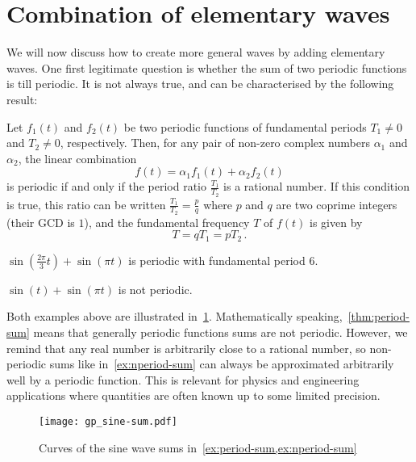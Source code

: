 \section{Combination of elementary waves}
We will now discuss how to create more general waves by adding elementary waves. One first
legitimate question is whether the sum of two periodic functions is till periodic. It is
not always true, and can be characterised by the following result:
\begin{theorem}
  \label{thm:period-sum}
  Let $f_1(t)$ and $f_2(t)$ be two periodic functions of fundamental periods $T_1\neq 0$
  and $T_2\neq 0$, respectively. Then, for any pair of non-zero complex numbers $\alpha_1$
  and $\alpha_2$, the linear combination
  \begin{equation}
    f(t)=\alpha_1 f_1(t)+\alpha_2 f_2(t)
  \end{equation}
  is periodic if and only if the period ratio  $\frac{T_1}{T_2}$ is a rational number. If
  this condition is true, this ratio can be written $\frac{T_1}{T_2}=\frac{p}{q}$ where
  $p$ and $q$ are two coprime integers (\ie their GCD is $1$), and the fundamental
  frequency $T$ of $f(t)$ is given by
  \begin{equation}
    T=qT_1=pT_2\,.
  \end{equation}
\end{theorem}
\begin{example}
  \label{ex:period-sum}
  $\sin\left(\frac{2\pi}{3}t\right)+\sin(\pi t)$ is periodic with fundamental period $6$.
\end{example}
\begin{example}
  \label{ex:nperiod-sum}
  $\sin(t)+\sin(\pi t)$ is not periodic.
\end{example}
\noindent Both examples above are illustrated in~\cref{fig:sine-sum}. Mathematically
speaking,~\cref{thm:period-sum} means that generally periodic functions sums are not
periodic. However, we remind that any real number is arbitrarily close to a rational
number, so non-periodic sums like in~\cref{ex:nperiod-sum} can always be approximated
arbitrarily well by a periodic function. This is relevant for physics and engineering
applications where quantities are often known up to some limited precision.
\begin{figure}[t]
  \centering
  \texttt{[image: gp\_sine-sum.pdf]}
  \caption{Curves of the sine wave sums in~\cref{ex:period-sum,ex:nperiod-sum}}
  \label{fig:sine-sum}
\end{figure}

